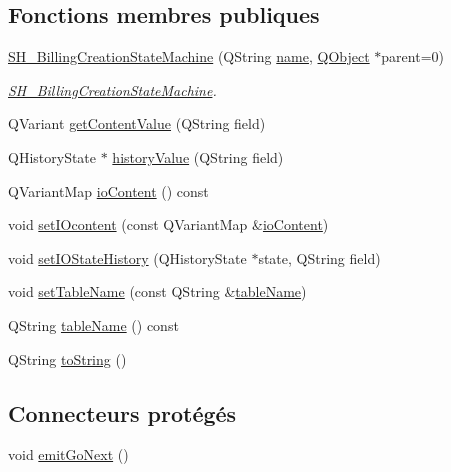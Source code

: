 \subsection*{Fonctions membres publiques}
\begin{DoxyCompactItemize}
\item 
\hyperlink{classSH__BillingCreationStateMachine_ad62b77fa4aeafe200056ff3974562f83}{S\-H\-\_\-\-Billing\-Creation\-State\-Machine} (Q\-String \hyperlink{classSH__NamedObject_a9f686c6f2a5bcc08ad03d0cee0151f0f}{name}, \hyperlink{classQObject}{Q\-Object} $\ast$parent=0)
\begin{DoxyCompactList}\small\item\em \hyperlink{classSH__BillingCreationStateMachine}{S\-H\-\_\-\-Billing\-Creation\-State\-Machine}. \end{DoxyCompactList}\item 
Q\-Variant \hyperlink{classSH__InOutStateMachine_aa1a3bd3c0ea8a59b9bc916dc718eb9ca}{get\-Content\-Value} (Q\-String field)
\item 
Q\-History\-State $\ast$ \hyperlink{classSH__InOutStateMachine_af71bfdb3b59b7bf2763588b513b4205f}{history\-Value} (Q\-String field)
\item 
Q\-Variant\-Map \hyperlink{classSH__InOutStateMachine_aaca105fbd5f5cc3bac115389ad3694c5}{io\-Content} () const 
\item 
void \hyperlink{classSH__InOutStateMachine_a8271a7ec7d5f6502449dd3b4da5f4155}{set\-I\-Ocontent} (const Q\-Variant\-Map \&\hyperlink{classSH__InOutStateMachine_aaca105fbd5f5cc3bac115389ad3694c5}{io\-Content})
\item 
void \hyperlink{classSH__InOutStateMachine_acbcce2c4300af1634d928b30e5e9be1c}{set\-I\-O\-State\-History} (Q\-History\-State $\ast$state, Q\-String field)
\item 
void \hyperlink{classSH__InOutStateMachine_a95db31a7e7f31f36a8737adc739ab08c}{set\-Table\-Name} (const Q\-String \&\hyperlink{classSH__InOutStateMachine_a4288a6c86ddf83effefff886675591c9}{table\-Name})
\item 
Q\-String \hyperlink{classSH__InOutStateMachine_a4288a6c86ddf83effefff886675591c9}{table\-Name} () const 
\item 
Q\-String \hyperlink{classSH__GenericStateMachine_a85c0c1c9d258ae991f84667412fa47cd}{to\-String} ()
\end{DoxyCompactItemize}
\subsection*{Connecteurs protégés}
\begin{DoxyCompactItemize}
\item 
void \hyperlink{classSH__GenericStateMachine_a2e162a1da1f694d433cb9072b37ac530}{emit\-Go\-Next} ()
\end{DoxyCompactItemize}

